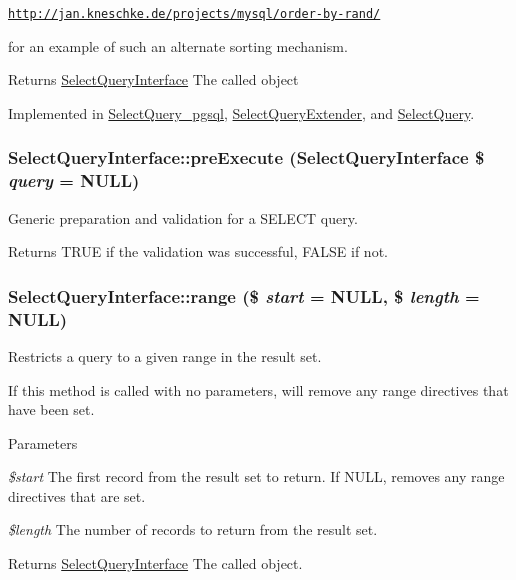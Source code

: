 \href{http://jan.kneschke.de/projects/mysql/order-by-rand/}{\tt http://jan.kneschke.de/projects/mysql/order-\/by-\/rand/}

for an example of such an alternate sorting mechanism.

\begin{DoxyReturn}{Returns}
\hyperlink{interfaceSelectQueryInterface}{SelectQueryInterface} The called object 
\end{DoxyReturn}


Implemented in \hyperlink{classSelectQuery__pgsql_a2aac16a64fec955bf8313aabdcad0fec}{SelectQuery\_\-pgsql}, \hyperlink{classSelectQueryExtender_afd183cab845d100b7890ff8cdfb380d4}{SelectQueryExtender}, and \hyperlink{classSelectQuery_af284bacf9e56ccf177d17f4b4bc84b03}{SelectQuery}.\hypertarget{interfaceSelectQueryInterface_a6e495fdb26a9b6a8752f381552140fa7}{
\subsubsection[{preExecute}]{\setlength{\rightskip}{0pt plus 5cm}SelectQueryInterface::preExecute ({\bf SelectQueryInterface} \$ {\em query} = {\ttfamily NULL})}}
\label{interfaceSelectQueryInterface_a6e495fdb26a9b6a8752f381552140fa7}
Generic preparation and validation for a SELECT query.

\begin{DoxyReturn}{Returns}
TRUE if the validation was successful, FALSE if not. 
\end{DoxyReturn}
\hypertarget{interfaceSelectQueryInterface_a028f87f97fb72e0e43050740fd323181}{
\subsubsection[{range}]{\setlength{\rightskip}{0pt plus 5cm}SelectQueryInterface::range (\$ {\em start} = {\ttfamily NULL}, \/  \$ {\em length} = {\ttfamily NULL})}}
\label{interfaceSelectQueryInterface_a028f87f97fb72e0e43050740fd323181}
Restricts a query to a given range in the result set.

If this method is called with no parameters, will remove any range directives that have been set.


\begin{DoxyParams}{Parameters}
\item[{\em \$start}]The first record from the result set to return. If NULL, removes any range directives that are set. \item[{\em \$length}]The number of records to return from the result set. \end{DoxyParams}
\begin{DoxyReturn}{Returns}
\hyperlink{interfaceSelectQueryInterface}{SelectQueryInterface} The called object. 
\end{DoxyReturn}


